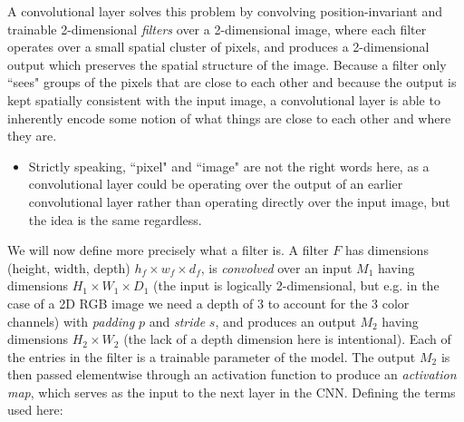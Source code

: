 A convolutional layer solves this problem by convolving position-invariant and trainable 2-dimensional \emph{filters} over a 2-dimensional image, where each filter operates over a small spatial cluster of pixels, and produces a 2-dimensional output which preserves the spatial structure of the image. Because a filter only ``sees" groups of the pixels that are close to each other and because the output is kept spatially consistent with the input image, a convolutional layer is able to inherently encode some notion of what things are close to each other and where they are.
\begin{itemize}
    \item Strictly speaking, ``pixel" and ``image" are not the right words here, as a convolutional layer could be operating over the output of an earlier convolutional layer rather than operating directly over the input image, but the idea is the same regardless.
\end{itemize}

We will now define more precisely what a filter is. A filter $F$ has dimensions (height, width, depth) $h_f \times w_f \times d_f$, is \emph{convolved} over an input $M_1$ having dimensions $H_1 \times W_1 \times D_1$ (the input is logically 2-dimensional, but e.g. in the case of a 2D RGB image we need a depth of 3 to account for the 3 color channels) with \emph{padding} $p$ and \emph{stride} $s$, and produces an output $M_2$ having dimensions $H_2 \times W_2$ (the lack of a depth dimension here is intentional). Each of the entries in the filter is a trainable parameter of the model. The output $M_2$ is then passed elementwise through an activation function to produce an \emph{activation map}, which serves as the input to the next layer in the CNN. Defining the terms used here:

